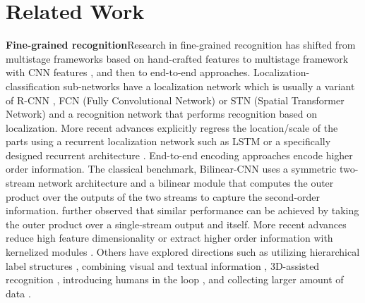\documentclass[10pt,twocolumn,letterpaper]{article}
\begin{document}
\section{Related Work} \label{sec2}
\noindent\textbf{Fine-grained recognition}\quad Research in fine-grained recognition has shifted from multistage
frameworks based on hand-crafted features \cite{ningzhang3, berg1, bangpeng, symbiotic, fgvcfisher} to
multistage framework with CNN features \cite{krause15, 2attention, neural_act, deepresp, tripmine}, and then to
end-to-end approaches. 
Localization-classification sub-networks
\cite{fg_rcnn, deeplac, spda_cnn, partstack, stn, hsnet, taomei1} have a localization network which is usually a variant of R-CNN
\cite{rcnn, fast_rcnn}, FCN (Fully Convolutional Network) \cite{fcn} or STN (Spatial Transformer Network) \cite{stn} and
a recognition network that performs recognition based on localization.
More recent advances explicitly regress the location/scale of the parts using a recurrent localization network such as LSTM
\cite{hsnet} or a specifically designed recurrent architecture \cite{taomei1}. End-to-end encoding approaches
 \cite{b_cnn, c_b_cnn, lowrank_bcnn, highorder1, highorder2} encode higher order information. The classical benchmark, Bilinear-CNN
\cite{b_cnn} uses a symmetric two-stream
network architecture and a bilinear module that computes the outer product over the outputs of the two streams to capture
the second-order information. \cite{c_b_cnn} further observed that similar performance can be achieved by taking the
outer product over a single-stream output and itself.
More recent advances reduce high feature dimensionality \cite{c_b_cnn, lowrank_bcnn} or extract higher order
information with kernelized modules \cite{highorder1, highorder2}. Others have explored directions such
as utilizing hierarchical label structures \cite{fzhou1}, combining
visual and textual information \cite{fzhou2, embed_fg, lan_fgvc}, 3D-assisted recognition \cite{car196, yenliang,
boxcar}, introducing humans in the loop \cite{human1, human2, human3}, and collecting larger amount of data \cite{har,
large_car, unreason, vegfru}.
\end{document}

